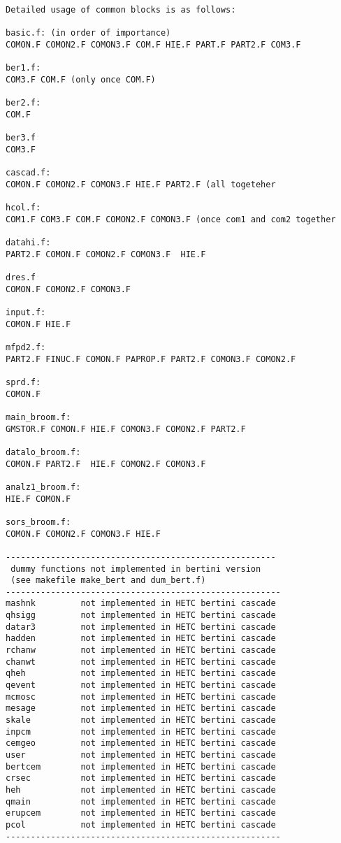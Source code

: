 \begin{verbatim}
Detailed usage of common blocks is as follows:

basic.f: (in order of importance)
COMON.F COMON2.F COMON3.F COM.F HIE.F PART.F PART2.F COM3.F

ber1.f:
COM3.F COM.F (only once COM.F)

ber2.f:
COM.F

ber3.f
COM3.F

cascad.f: 
COMON.F COMON2.F COMON3.F HIE.F PART2.F (all togeteher

hcol.f:
COM1.F COM3.F COM.F COMON2.F COMON3.F (once com1 and com2 together

datahi.f:
PART2.F COMON.F COMON2.F COMON3.F  HIE.F

dres.f  
COMON.F COMON2.F COMON3.F

input.f:
COMON.F HIE.F

mfpd2.f:
PART2.F FINUC.F COMON.F PAPROP.F PART2.F COMON3.F COMON2.F

sprd.f:
COMON.F

main_broom.f:
GMSTOR.F COMON.F HIE.F COMON3.F COMON2.F PART2.F

datalo_broom.f:
COMON.F PART2.F  HIE.F COMON2.F COMON3.F

analz1_broom.f:
HIE.F COMON.F

sors_broom.f:
COMON.F COMON2.F COMON3.F HIE.F 

------------------------------------------------------
 dummy functions not implemented in bertini version
 (see makefile make_bert and dum_bert.f)
-------------------------------------------------------
mashnk         not implemented in HETC bertini cascade
qhsigg         not implemented in HETC bertini cascade
datar3         not implemented in HETC bertini cascade
hadden         not implemented in HETC bertini cascade
rchanw         not implemented in HETC bertini cascade
chanwt         not implemented in HETC bertini cascade
qheh           not implemented in HETC bertini cascade
qevent         not implemented in HETC bertini cascade
mcmosc         not implemented in HETC bertini cascade
mesage         not implemented in HETC bertini cascade
skale          not implemented in HETC bertini cascade
inpcm          not implemented in HETC bertini cascade
cemgeo         not implemented in HETC bertini cascade
user           not implemented in HETC bertini cascade
bertcem        not implemented in HETC bertini cascade
crsec          not implemented in HETC bertini cascade
heh            not implemented in HETC bertini cascade
qmain          not implemented in HETC bertini cascade
erupcem        not implemented in HETC bertini cascade
pcol           not implemented in HETC bertini cascade
-------------------------------------------------------


\end{verbatim}
